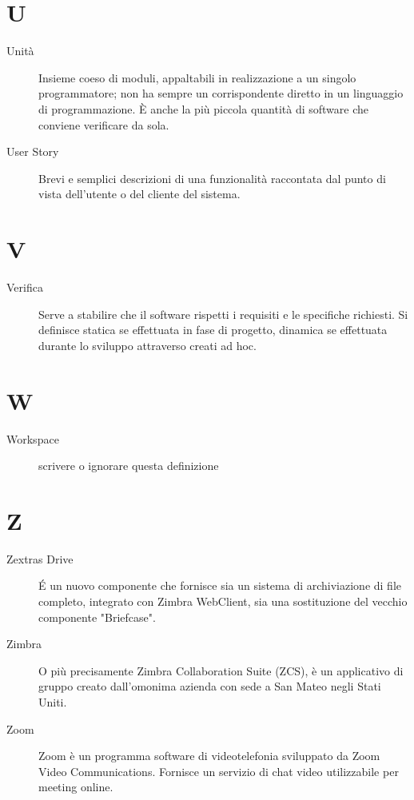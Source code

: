 \documentclass[a4paper, oneside]{article}
\begin{document}
\section{U}
\begin{description}
  \item[Unità] Insieme coeso di moduli, appaltabili in realizzazione a un singolo programmatore; non ha sempre un corrispondente diretto in un linguaggio di programmazione. È anche la più piccola quantità di software che conviene verificare da sola.
  \item[User Story] Brevi e semplici descrizioni di una funzionalità raccontata dal punto di vista dell’utente o del cliente del sistema.
\end{description}
\newpage
\section{V}
\begin{description}
  \item[Verifica] Serve a stabilire che il software rispetti i requisiti e le specifiche richiesti. Si definisce statica se effettuata in fase di progetto, dinamica se effettuata durante lo sviluppo attraverso  creati ad hoc.
\end{description}
\newpage
\section{W}
\begin{description}
  \item[Workspace] {scrivere o ignorare questa definizione}
\end{description}
\newpage
\section{Z}
\begin{description}
  \item[Zextras Drive] É un nuovo componente  che fornisce sia un sistema di archiviazione di file completo, integrato con Zimbra WebClient, sia una sostituzione del vecchio componente "Briefcase".
  \item[Zimbra] O più precisamente Zimbra Collaboration Suite (ZCS), è un  applicativo di gruppo creato dall'omonima azienda con sede a San Mateo negli Stati Uniti.
  \item[Zoom] Zoom è un programma software di videotelefonia sviluppato da Zoom Video Communications. Fornisce un servizio di chat video utilizzabile per meeting online.
\end{description}
\newpage
\end{document}
